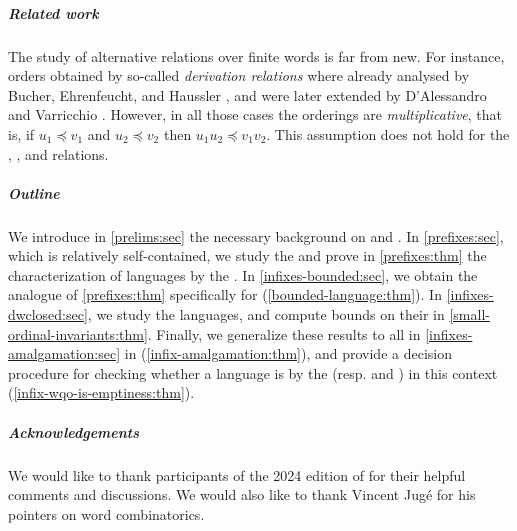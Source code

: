 \subparagraph{Related work} The study of alternative 
relations over finite words is far from new. For instance, orders obtained by
so-called \emph{derivation relations} where already analysed by Bucher,
Ehrenfeucht, and Haussler \cite{BUEUD85}, and were later extended by
D'Alessandro and Varricchio \cite{ALVA03,ALVA06}. However, in all those cases
the orderings are \emph{multiplicative}, that is, if $u_1 \preceq v_1$ and $u_2
\preceq v_2$ then $u_1u_2 \preceq v_1v_2$. This assumption does not hold for
the , , and  relations.

\subparagraph{Outline} 
We introduce in \cref{prelims:sec} the
necessary background on  and .
In
\cref{prefixes:sec}, which is relatively
self-contained, we study the  and prove in
\cref{prefixes:thm} the characterization of 
languages by the . In
\cref{infixes-bounded:sec}, we
obtain the  analogue of \cref{prefixes:thm}
specifically for 
(\cref{bounded-language:thm}). 
In \cref{infixes-dwclosed:sec}, we study the 
languages, and compute bounds on their  in \cref{small-ordinal-invariants:thm}.
Finally, 
we generalize these results to all
 in \cref{infixes-amalgamation:sec}
in
(\cref{infix-amalgamation:thm}),
and provide a decision procedure for checking whether a language is
 by the  (resp.  and ) in
this context (\cref{infix-wqo-is-emptiness:thm}).

\subparagraph{Acknowledgements} We would like to thank participants of the 2024
edition of  for their helpful comments and discussions.
We would also like to thank Vincent Jugé for his pointers on word combinatorics.
